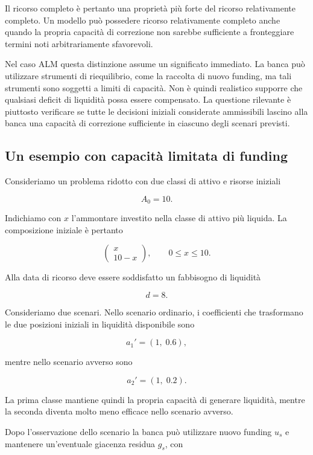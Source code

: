 Il ricorso completo \`e pertanto una propriet\`a pi\`u forte del ricorso relativamente  completo. Un modello pu\`o possedere ricorso relativamente completo
anche quando la propria capacit\`a di correzione non sarebbe sufficiente a
fronteggiare termini noti arbitrariamente sfavorevoli.

Nel caso ALM questa distinzione assume un significato immediato. La banca pu\`o
utilizzare strumenti di riequilibrio, come la raccolta di nuovo funding, ma
tali strumenti sono soggetti a limiti di capacit\`a. Non \`e quindi realistico
supporre che qualsiasi deficit di liquidit\`a possa essere compensato. La
questione rilevante \`e piuttosto verificare se tutte le decisioni iniziali
considerate ammissibili lascino alla banca una capacit\`a di correzione
sufficiente in ciascuno degli scenari previsti.

\subsection{Un esempio con capacit\`a limitata di funding}

Consideriamo un problema ridotto con due classi di attivo e risorse iniziali

\[
A_0=10.
\]

Indichiamo con $x$ l'ammontare investito nella classe di attivo pi\`u liquida.
La composizione iniziale \`e pertanto

\[
\begin{pmatrix}
x\\
10-x
\end{pmatrix},
\qquad
0\leq x\leq10.
\]

Alla data di ricorso deve essere soddisfatto un fabbisogno di liquidit\`a

\[
d=8.
\]

Consideriamo due scenari. Nello scenario ordinario, i coefficienti che
trasformano le due posizioni iniziali in liquidit\`a disponibile sono

\[
a_1'
=
(1,\;0.6),
\]

mentre nello scenario avverso sono

\[
a_2'
=
(1,\;0.2).
\]

La prima classe mantiene quindi la propria capacit\`a di generare liquidit\`a,
mentre la seconda diventa molto meno efficace nello scenario avverso.

Dopo l'osservazione dello scenario la banca pu\`o utilizzare nuovo funding
$u_s$ e mantenere un'eventuale giacenza residua $g_s$, con

